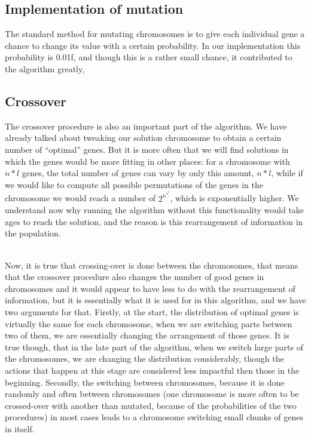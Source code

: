 \documentclass{article}
\begin{document}
\subsection{Implementation of mutation}
The standard method for mutating chromosomes is to give each individual gene a chance to change its value with a certain probability. In our implementation this probability is 0.01f, and though this is a rather small chance, it contributed to the algorithm greatly,

\subsection{Crossover}
The crossover procedure is also an important part of the algorithm. We have already talked about tweaking our solution chromosome to obtain a certain number of “optimal” genes. But it is more often that we will find solutions in which the genes would be more fitting in other places: for a chromosome with $n*l$ genes, the total number of genes can vary by only this amount,  $n*l$, while if we would like to compute all possible permutations of the genes in the chromosome we would reach a number of $2^n^*^l$, which is exponentially higher. We understand now why running the algorithm without this functionality would take ages to reach the solution, and the reason is this rearrangement of information in the population. \\\\
\par Now, it is true that crossing-over is done between the chromosomes, that means that the crossover procedure also changes the number of good genes in chromosomes and it would appear to have less to do with the rearrangement of information, but it is essentially what it is used for in this algorithm, and we have two arguments for that. Firstly, at the start, the distribution of optimal genes is virtually the same for each chromosome, when we are switching parts between two of them, we are essentially changing the arrangement of those genes. It is true though, that in the late part of the algorithm, when we switch large parts of the chromosomes, we are changing the distribution considerably, though the actions that happen at this stage are considered less impactful then those in the beginning. Secondly, the switching between chromosomes, because it is done randomly and often between chromosomes (one chromosome is more often to be crossed-over with another than mutated, because of the probabilities of the two procedures) in most cases leads to a chromosome switching small chunks of genes in itself.
\end{document}
